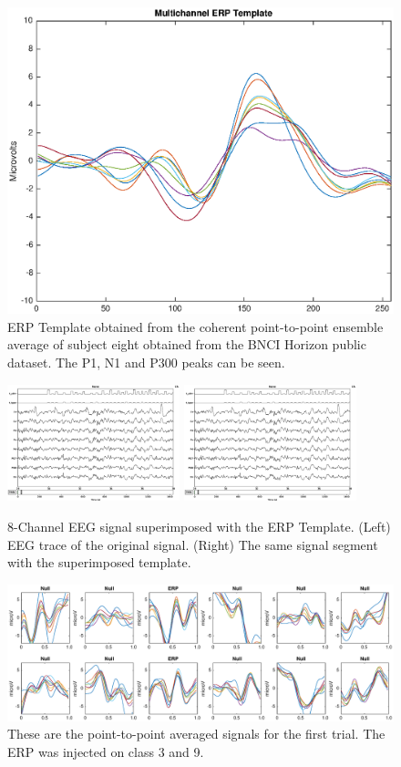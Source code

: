 \documentclass[sensors,article,submit,moreauthors,pdftex,10pt,a4paper]{mdpi}
\begin{document}
\begin{figure}[H]
\centering
\includegraphics[width=12cm]{images/erptemplate1.eps}
\caption{ERP Template obtained from the coherent point-to-point ensemble average of subject eight obtained from the BNCI Horizon public dataset. The P1, N1 and P300 peaks can be seen.}
\label{fig:erptemplate1}
\end{figure}

\begin{figure}[H]
\centering
\includegraphics[width=5cm]{images/doublegain.eps}
\includegraphics[width=5cm]{images/triplegain.eps}
\caption{8-Channel EEG signal superimposed with the ERP Template.  (Left) EEG trace of the original signal. (Right) The same signal segment with the superimposed template.}
\label{fig:doubleandtriplegain}
\end{figure}

\begin{figure}[H]
\centering
\includegraphics[width=15cm]{images/GainCheck.eps}
\caption{These are the point-to-point averaged signals for the first trial.  The ERP was injected on class 3 and 9.}
\label{fig:gaincheck}
\end{figure}
\end{document}
